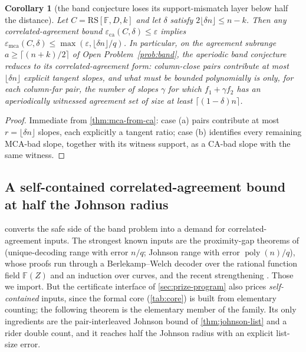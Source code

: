 \documentclass[11pt]{article}
\newtheorem{corollary}[theorem]{Corollary}
\theoremstyle{definition}
\theoremstyle{remark}
\newcommand{\F}{\mathbb{F}}
\newcommand{\RS}{\mathrm{RS}}
\newcommand{\eca}{\varepsilon_{\mathrm{ca}}}
\newcommand{\emca}{\varepsilon_{\mathrm{mca}}}
\begin{document}
\begin{corollary}[the band conjecture loses its support-mismatch layer below half the distance]\label{cor:band-reduction}
Let $C=\RS[\F,D,k]$ and let $\delta$ satisfy $2\lfloor\delta n\rfloor\le n-k$. Then any correlated-agreement bound $\eca(C,\delta)\le\varepsilon$ implies $\emca(C,\delta)\le\max(\varepsilon,\lfloor\delta n\rfloor/q)$. In particular, on the agreement subrange $a\ge\lceil(n+k)/2\rceil$ of Open Problem~\ref{prob:band}, the aperiodic band conjecture reduces to its correlated-agreement form: column-close pairs contribute at most $\lfloor\delta n\rfloor$ explicit tangent slopes, and what must be bounded polynomially is only, for each column-far pair, the number of slopes $\gamma$ for which $f_1+\gamma f_2$ has an aperiodically witnessed agreement set of size at least $\lceil(1-\delta)n\rceil$.
\end{corollary}

\begin{proof}
Immediate from \cref{thm:mca-from-ca}: case \textup{(a)} pairs contribute at most $r=\lfloor\delta n\rfloor$ slopes, each explicitly a tangent ratio; case \textup{(b)} identifies every remaining MCA-bad slope, together with its witness support, as a CA-bad slope with the same witness.
\end{proof}

\subsection{A self-contained correlated-agreement bound at half the Johnson radius}\label{sec:pincer-ca}

 converts the safe side of the band problem into a demand for correlated-agreement inputs. The strongest known inputs are the proximity-gap theorems of \cite{BCIKS20} (unique-decoding range with error $n/q$; Johnson range with error $\operatorname{poly}(n)/q$), whose proofs run through a Berlekamp--Welch decoder over the rational function field $\F(Z)$ and an induction over curves, and the recent strengthening \cite{BCHKS25}. Those we import. But the certificate interface of \cref{sec:prize-program} also prices \emph{self-contained} inputs, since the formal core (\cref{tab:core}) is built from elementary counting; the following theorem is the elementary member of the family. Its only ingredients are the pair-interleaved Johnson bound of \cref{thm:johnson-list} and a rider double count, and it reaches half the Johnson radius with an explicit list-size error.
\end{document}
